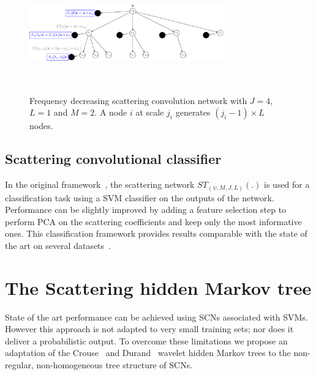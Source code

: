 \documentclass{article}
\begin{document}
    \begin{figure}
      \begin{center}
        \includegraphics[width=3.3in, height=2in, keepaspectratio]{ST_freqDec_crop.pdf}
        \caption[Frequency decreasing scattering convolution network.]{\centering  Frequency decreasing scattering convolution network with $J=4$, $L=1$ and $M=2$. A node $i$ at scale $j_{i}$ generates $(j_{i}-1) \times L$ nodes. }
        \label{fig:SCN 2}
      \end{center}
      \vspace{-15pt}
    \end{figure}
  
  \vspace{-5pt}
  \subsection{Scattering convolutional classifier}
    \label{subsec:SCN/SCC}
    \vspace{-5pt}
    In the original framework~\cite{bruna2013scattering}, the scattering network $ST_{(\psi, M,J,L)}(.)$ is used for a classification task using a SVM classifier on the outputs of the network. Performance can be slightly improved by adding a feature selection step to perform PCA on the scattering coefficients and keep only the most informative ones. This classification framework provides
    results comparable with the state of the art on several datasets~\cite{bruna2010classification}.


\section{The Scattering hidden Markov tree}
  \label{sec:SCHMT}
  \vspace{-5pt}
  State of the art performance can be achieved using SCNs associated with SVMs. However this approach is not adapted to very small training sets; nor does it deliver a probabilistic output. To overcome these
  limitations we propose an adaptation of the Crouse~\cite{crouse1998wavelet} and Durand~\cite{durand2004computational} wavelet hidden Markov trees to the non-regular, non-homogeneous tree structure of SCNs.
  
\end{document}
